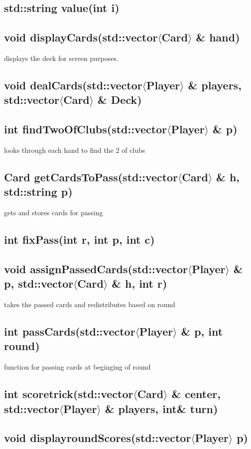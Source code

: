\documentclass[]{scrartcl}
\begin{document}
\subsection{std::string value(int i)}
\subsection{void displayCards(std::vector$\langle$Card$\rangle$ \& hand)}
	displays the deck for screen purposes.
\subsection{void dealCards(std::vector$\langle$Player$\rangle$ \& players, std::vector$\langle$Card$\rangle$ \& Deck)}
\subsection{int findTwoOfClubs(std::vector$\langle$Player$\rangle$ \& p)}  
	looks through each hand to find the 2 of clubs
\subsection{Card getCardsToPass(std::vector$\langle$Card$\rangle$ \& h, std::string p) }
	gets and stores cards for passing
\subsection{int fixPass(int r, int p, int c)}
\subsection{void assignPassedCards(std::vector$\langle$Player$\rangle$ \& p, std::vector$\langle$Card$\rangle$ \& h, int r)  }
	takes the passed cards and redistributes based on round
\subsection{int passCards(std::vector$\langle$Player$\rangle$ \& p, int round)  }
	function for passing cards at beginging of round
\subsection{int scoretrick(std::vector$\langle$Card$\rangle$ \& center, std::vector$\langle$Player$\rangle$ \& players, int\& turn)}
\subsection{void displayroundScores(std::vector$\langle$Player$\rangle$ p)}
\end{document}

